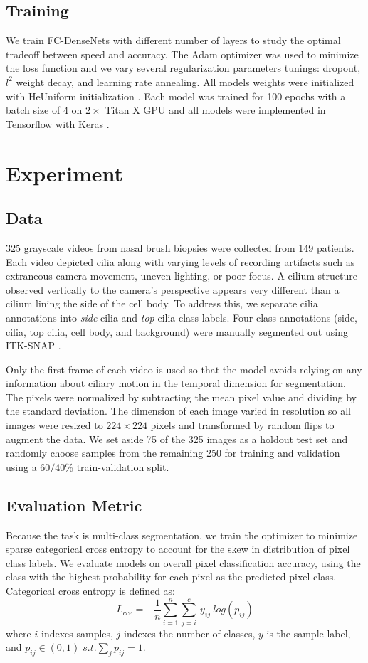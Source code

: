 \documentclass{llncs}
\begin{document}
\subsection{Training}
We train FC-DenseNets with different number of layers to study the optimal tradeoff between speed and accuracy. The Adam \cite{Adam} optimizer was used to minimize the loss function and we vary several regularization parameters tunings: dropout, $l^2$ weight decay, and learning rate annealing. All models weights were initialized with HeUniform initialization \cite {ReLU}. Each model was trained for 100 epochs with a batch size of 4 on $2  \times$ Titan X GPU and all models were implemented in Tensorflow with Keras \cite{TensorFlow,Keras}.


\section{Experiment}

\subsection{Data}
325 grayscale videos from nasal brush biopsies were collected from 149 patients. Each video depicted cilia along with varying levels of recording artifacts such as extraneous camera movement, uneven lighting, or poor focus. A cilium structure observed vertically to the camera's perspective appears very different than a cilium lining the side of the cell body. To address this, we separate cilia annotations into \textit{side} cilia and \textit{top} cilia class labels. Four class annotations (side, cilia, top cilia, cell body, and background) were manually segmented out using ITK-SNAP \cite{ITK-SNAP}.
\par
Only the first frame of each video is used so that the model avoids relying on any information about ciliary motion in the temporal dimension for segmentation. The pixels were normalized by subtracting the mean pixel value and dividing by the standard deviation. The dimension of each image varied in resolution so all images were resized to $224 \times 224$ pixels and transformed by random flips to augment the data. We set aside 75 of the 325 images as a holdout test set and randomly choose samples from the remaining 250 for training and validation using a $60/40$\% train-validation split.

\subsection{Evaluation Metric}
Because the task is multi-class segmentation, we train the optimizer to minimize sparse categorical cross entropy to account for the skew in distribution of pixel class labels. We evaluate models on overall pixel classification accuracy, using the class with the highest probability for each pixel as the predicted pixel class. Categorical cross entropy is defined as:
\begin{equation}
L_{cce} = -\frac{1}{n}\sum^n_{i=1}\sum^c_{j=i}\ y_{ij}\ log\left(p_{ij}\right)
\end{equation}
where $i$ indexes samples, $j$ indexes the number of classes, $y$ is the sample label, and $p_{ij} \in (0, 1) \; s.t. \sum_j p_{ij} = 1$.
\end{document}
